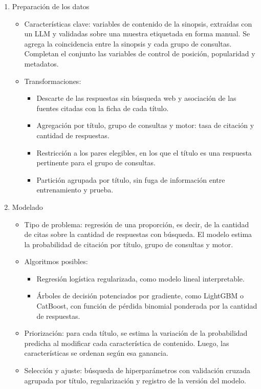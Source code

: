 \documentclass[
11pt, %
codirector, %
]{charter}
\begin{document}
\begin{enumerate}
	\item Preparación de los datos
	\begin{itemize}
		\item Características clave: variables de contenido de la sinopsis, extraídas con un LLM y validadas sobre una muestra etiquetada en forma manual. Se agrega la coincidencia entre la sinopsis y cada grupo de consultas. Completan el conjunto las variables de control de posición, popularidad y metadatos.
		\item Transformaciones:
		\begin{itemize}
			\item Descarte de las respuestas sin búsqueda web y asociación de las fuentes citadas con la ficha de cada título.
			\item Agregación por título, grupo de consultas y motor: tasa de citación y cantidad de respuestas.
			\item Restricción a los pares elegibles, en los que el título es una respuesta pertinente para el grupo de consultas.
			\item Partición agrupada por título, sin fuga de información entre entrenamiento y prueba.
		\end{itemize}
	\end{itemize}

	\item Modelado
	\begin{itemize}
		\item Tipo de problema: regresión de una proporción, es decir, de la cantidad de citas sobre la cantidad de respuestas con búsqueda. El modelo estima la probabilidad de citación por título, grupo de consultas y motor.
		\item Algoritmos posibles:
		\begin{itemize}
			\item Regresión logística regularizada, como modelo lineal interpretable.
			\item Árboles de decisión potenciados por gradiente, como LightGBM o CatBoost, con función de pérdida binomial ponderada por la cantidad de respuestas.
		\end{itemize}
		\item Priorización: para cada título, se estima la variación de la probabilidad predicha al modificar cada característica de contenido. Luego, las características se ordenan según esa ganancia.
		\item Selección y ajuste: búsqueda de hiperparámetros con validación cruzada agrupada por título, regularización y registro de la versión del modelo.
	\end{itemize}


\end{enumerate}
\end{document}
